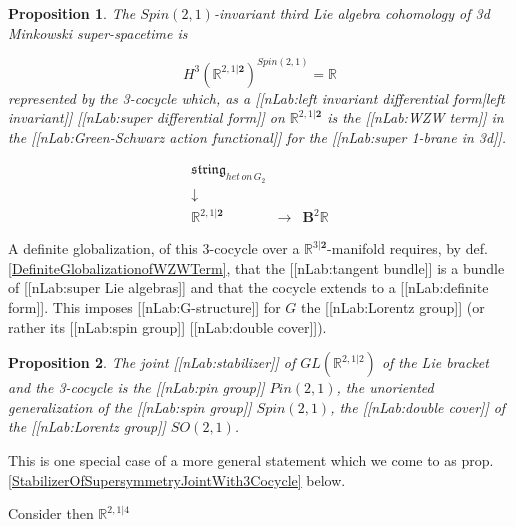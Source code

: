 \documentclass[12pt,titlepage]{article}
\newcommand{\itexarray}[1]{\begin{matrix}#1\end{matrix}}
\theoremstyle{plain}
\newtheorem{prop}{Proposition}
\theoremstyle{definition}
\theoremstyle{remark}
\begin{document}
\begin{prop}
\label{}\hypertarget{}{}
The $Spin(2,1)$-invariant third Lie algebra cohomology of 3d Minkowski super-spacetime is

\begin{displaymath}
H^3(\mathbb{R}^{2,1\vert \mathbf{2}})^{Spin(2,1)} = \mathbb{R}
\end{displaymath}
represented by the 3-cocycle which, as a [[nLab:left invariant differential form|left invariant]] [[nLab:super differential form]] on $\mathbb{R}^{2,1\vert \mathbf{2}}$ is the [[nLab:WZW term]] in the [[nLab:Green-Schwarz action functional]] for the [[nLab:super 1-brane in 3d]].

\begin{displaymath}
\itexarray{
     \mathfrak{string}_{het \, on \, G_2}
     \\
     \downarrow
     \\
     \mathbb{R}^{2,1\vert \mathbf{2}}
      &\stackrel{}{\longrightarrow}&
     \mathbf{B}^2 \mathbb{R}
  }
\end{displaymath}
\end{prop}
A definite globalization, of this 3-cocycle over a $\mathbb{R}^{3\vert \mathbf{2}}$-manifold requires, by def. \ref{DefiniteGlobalizationofWZWTerm}, that the [[nLab:tangent bundle]] is a bundle of [[nLab:super Lie algebras]] and that the cocycle extends to a [[nLab:definite form]]. This imposes [[nLab:G-structure]] for $G$ the [[nLab:Lorentz group]] (or rather its [[nLab:spin group]] [[nLab:double cover]]).

\begin{prop}
\label{}\hypertarget{}{}
The joint [[nLab:stabilizer]] of $GL(\mathbb{R}^{2,1\vert 2})$ of the Lie bracket and the 3-cocycle is the [[nLab:pin group]] $Pin(2,1)$, the unoriented generalization of the [[nLab:spin group]] $Spin(2,1)$, the [[nLab:double cover]] of the [[nLab:Lorentz group]] $SO(2,1)$.

\end{prop}
This is one special case of a more general statement which we come to as prop. \ref{StabilizerOfSupersymmetryJointWith3Cocycle} below.

Consider then $\mathbb{R}^{2,1\vert 4}$
\end{document}

